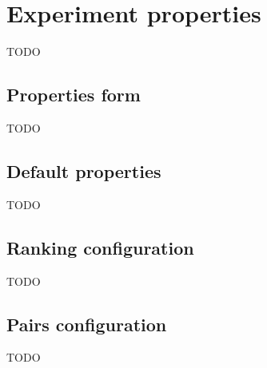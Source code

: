 \section{Experiment properties}\label{section:properties}

TODO

\subsection{Properties form}\label{sub:properties-form}

TODO

\subsection{Default properties}\label{sub:properties-default}

TODO

\subsection{Ranking configuration}\label{sub:properties-ranking}

TODO

\subsection{Pairs configuration}\label{sub:properties-pairs}

TODO

\vfill\newpage